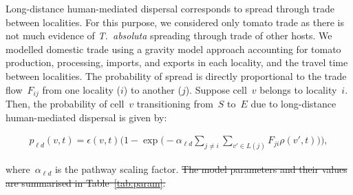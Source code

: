 \documentclass[11pt]{article}
\newcommand{\tuta}{\emph{T.~absoluta}}
\newcommand{\infest}{\rho}
\newcommand{\suitable}{\epsilon}
\newcommand{\pld}{p_{\ell d}}
\newcommand{\ald}{\alpha_{\ell d}}
\newcommand{\locality}{{L}}
\theoremstyle{definition}
\providecommand{\DIFdeltex}[1]{{\protect\color{red}\sout{#1}}}                      %
\providecommand{\DIFdelbegin}{} %
\providecommand{\DIFdelend}{} %
\providecommand{\DIFdel}[1]{\texorpdfstring{\DIFdeltex{#1}}{}} %
\newcommand{\DIFscaledelfig}{0.5}
\newlength{\DIFdelgraphicswidth} %
\newlength{\DIFdelgraphicsheight} %
\newcommand{\DIFdelincludegraphics}[2][]{%
\sbox{\DIFdelgraphicsbox}{\DIFOincludegraphics[#1]{#2}}%
\settoboxwidth{\DIFdelgraphicswidth}{\DIFdelgraphicsbox} %
\settoboxtotalheight{\DIFdelgraphicsheight}{\DIFdelgraphicsbox} %
\scalebox{\DIFscaledelfig}{%
\parbox[b]{\DIFdelgraphicswidth}{\usebox{\DIFdelgraphicsbox}\\[-\baselineskip] \rule{\DIFdelgraphicswidth}{0em}}\llap{\resizebox{\DIFdelgraphicswidth}{\DIFdelgraphicsheight}{%
\setlength{\unitlength}{\DIFdelgraphicswidth}%
\begin{picture}(1,1)%
\thicklines\linethickness{2pt} %
{\color[rgb]{1,0,0}\put(0,0){\framebox(1,1){}}}%
{\color[rgb]{1,0,0}\put(0,0){\line( 1,1){1}}}%
{\color[rgb]{1,0,0}\put(0,1){\line(1,-1){1}}}%
\end{picture}%
}\hspace*{3pt}}} %
} %
\DeclareRobustCommand{\DIFdelbegin}{\DIFOdelbegin \let\includegraphics\DIFdelincludegraphics} %
\DeclareRobustCommand{\DIFdelend}{\DIFOaddend \let\includegraphics\DIFOincludegraphics} %
\begin{document}
Long-distance human-mediated dispersal corresponds to spread through trade
between localities. For this purpose, we considered only tomato trade as
there is not much evidence of \tuta{} spreading through trade of other
hosts. We modelled domestic trade using a gravity model approach accounting
for tomato production, processing, imports, and exports in each locality,
and the travel time between localities.  The probability of spread is
directly proportional to the trade flow~$F_{ij}$ from one locality ($i$) to
another ($j$).  Suppose cell~$v$ belongs to locality~$i$. Then, the
probability of cell~$v$ transitioning from~$S$ to~$E$ due to long-distance
human-mediated dispersal is given by:
\begin{linenomath}
\begin{align}\label{eqn:pld}
    \pld(v,t)=\suitable(v,t)\bigg(1-
    \exp\Big(-\ald\sum_{j\ne i}\sum_{v'\in\locality(j)}F_{ji}\infest(v',t)\Big)\bigg),
\end{align}
\end{linenomath}
where~$\ald$ is the pathway scaling factor. 
\DIFdelbegin \DIFdel{The model parameters and their
values are summarised in Table~\ref{tab:param}.
}\DIFdelend %
\end{document}
